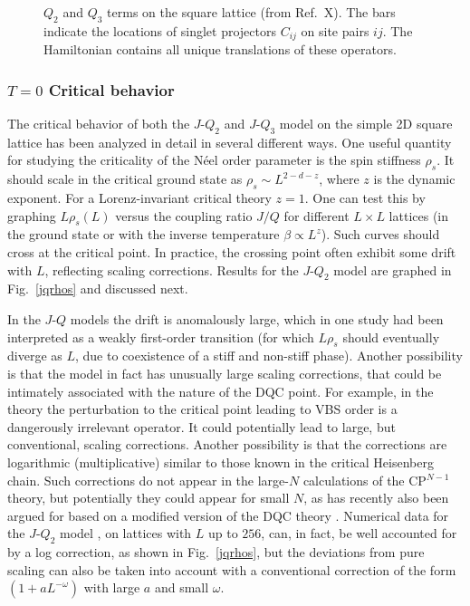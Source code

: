 \documentclass[range]{ar2e}
\begin{document}
\begin{figure}
\centerline{}
\caption{$Q_2$ and $Q_3$ terms on the square lattice (from Ref.~X). The bars indicate the locations of singlet projectors 
$C_{ij}$ on site pairs $ij$. The Hamiltonian contains all unique translations of these operators.}
\label{qterms}
\end{figure}

\subsubsection{$T=0$ Critical behavior}

The critical behavior of both the $J$-$Q_2$ and $J$-$Q_3$ model on the simple 2D square lattice has been analyzed in detail in several different ways. 
One useful quantity for studying the criticality of the N\'eel order parameter is the spin stiffness $\rho_s$. It should scale in the critical ground state 
as $\rho_s \sim L^{2-d-z}$, where $z$ is the dynamic exponent. For a Lorenz-invariant critical theory $z=1$. One can test this by graphing $L\rho_s(L)$ versus 
the coupling ratio $J/Q$ for different $L\times L$ lattices (in the ground state or with the inverse temperature $\beta \propto L^z$). Such curves should 
cross at the critical point. In practice, the crossing point often exhibit some drift with $L$, reflecting scaling corrections. Results for the $J$-$Q_2$ 
model are graphed in Fig.~\ref{jqrhos} and discussed next.

In the $J$-$Q$ models the drift is anomalously large, which in one study \cite{Jiang08} had been interpreted as a weakly first-order transition (for which 
$L\rho_s$ should eventually diverge as $L$, due to coexistence of a stiff and non-stiff phase). Another possibility is that the model in fact has unusually
large scaling corrections, that could be intimately associated with the nature of the DQC point. For example, in the
theory the perturbation to the critical point leading to VBS order is a dangerously irrelevant operator. It could potentially lead to large, but
conventional, scaling corrections. Another possibility is that the corrections are logarithmic (multiplicative) \cite{Sandvik10c,banerjee2010:log} 
similar to those known in the critical Heisenberg chain. Such corrections do not appear in the large-$N$ calculations of the CP$^{N-1}$ theory, but 
potentially they could appear for small $N$, as has recently also been argued for based on a modified version of the DQC theory \cite{Nogueira11}. 
Numerical data for the $J$-$Q_2$ model \cite{Sandvik10c}, on lattices with $L$ up to $256$, can, in fact, be well accounted for by a log correction, 
as shown in Fig.~\ref{jqrhos}, but the deviations from pure scaling can also be taken into account with a conventional correction of the form 
$(1+aL^{-\omega})$ with large $a$ and small $\omega$.
\end{document}

